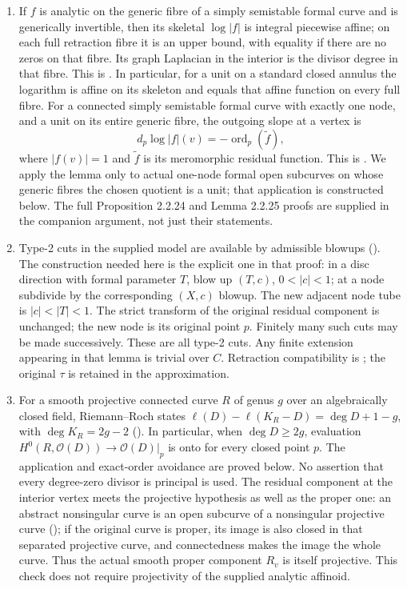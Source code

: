 \documentclass[11pt]{article}
\newcommand{\ord}{\operatorname{ord}}
\begin{document}
\begin{enumerate}
\item If $f$ is analytic on the generic fibre of a simply semistable
formal curve and is generically invertible, then its skeletal
$\log|f|$ is integral piecewise affine; on each full retraction fibre
it is an upper bound, with equality if there are no zeros on that
fibre. Its graph Laplacian in the interior is the divisor degree in
that fibre. This is \cite[Proposition 2.2.24]{Thu}. In particular,
for a unit on a standard closed annulus the logarithm is affine on
its skeleton and equals that affine function on every full fibre.
For a connected simply semistable formal curve with exactly one node,
and a unit on its entire generic fibre, the outgoing slope at a
vertex is
\[
                 d_p\log|f|(v)=-\ord_p(\widetilde f),
\]
where $|f(v)|=1$ and $\widetilde f$ is its meromorphic residual
function. This is \cite[Lemma 2.2.25]{Thu}. We apply the lemma only
to actual one-node formal open subcurves on whose generic fibres
the chosen quotient is a unit; that application is constructed below.
The full Proposition 2.2.24 and Lemma 2.2.25 proofs are supplied in
the companion argument, not just their statements.

\item Type-2 cuts in the supplied model are available by admissible
blowups (\cite[Lemma 2.2.22]{Thu}). The construction needed here is
the explicit one in that proof: in a disc direction with formal
parameter $T$, blow up $(T,c)$, $0<|c|<1$; at a node subdivide by
the corresponding $(X,c)$ blowup. The new adjacent node tube is
$|c|<|T|<1$. The strict transform of the original residual component
is unchanged; the new node is its original point $p$. Finitely many
such cuts may be made successively. These are all type-2 cuts.
Any finite extension appearing in that lemma is trivial over $C$.
Retraction compatibility is \cite[Proposition 2.2.26]{Thu}; the
original $\tau$ is retained in the approximation.

\item For a smooth projective connected curve $R$ of genus $g$ over an
algebraically closed field, Riemann--Roch states
$\ell(D)-\ell(K_R-D)=\deg D+1-g$, with $\deg K_R=2g-2$
(\cite[IV, Theorem 1.3 and Example 1.3.3]{Hart}). In particular,
when $\deg D\geq2g$, evaluation
$H^0(R,\mathcal{O}(D))\to\mathcal{O}(D)|_p$ is onto for every closed
point $p$. The application and exact-order avoidance are proved below.
No assertion that every degree-zero divisor is principal is used.
The residual component at the interior vertex meets the projective
hypothesis as well as the proper one: an abstract nonsingular curve
is an open subcurve of a nonsingular projective curve
(\cite[I, Corollary 6.10, following Theorem 6.9]{Hart}); if the original curve is proper,
its image is also closed in that separated projective curve, and
connectedness makes the image the whole curve. Thus the actual
smooth proper component $R_v$ is itself projective. This check
does not require projectivity of the supplied analytic affinoid.


\end{enumerate}
\end{document}
